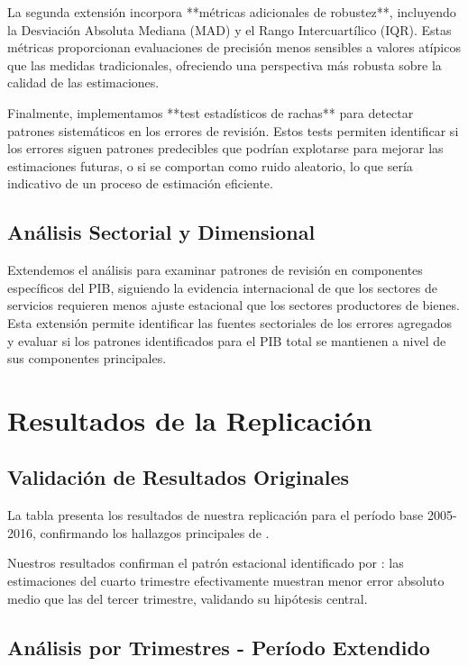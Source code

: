 \documentclass{article}
\begin{document}
La segunda extensión incorpora **métricas adicionales de robustez**, incluyendo la Desviación Absoluta Mediana (MAD) y el Rango Intercuartílico (IQR). Estas métricas proporcionan evaluaciones de precisión menos sensibles a valores atípicos que las medidas tradicionales, ofreciendo una perspectiva más robusta sobre la calidad de las estimaciones.

Finalmente, implementamos **test estadísticos de rachas** para detectar patrones sistemáticos en los errores de revisión. Estos tests permiten identificar si los errores siguen patrones predecibles que podrían explotarse para mejorar las estimaciones futuras, o si se comportan como ruido aleatorio, lo que sería indicativo de un proceso de estimación eficiente.

\subsection{Análisis Sectorial y Dimensional}

Extendemos el análisis para examinar patrones de revisión en componentes específicos del PIB, siguiendo la evidencia internacional de que los sectores de servicios requieren menos ajuste estacional que los sectores productores de bienes. Esta extensión permite identificar las fuentes sectoriales de los errores agregados y evaluar si los patrones identificados para el PIB total se mantienen a nivel de sus componentes principales.

\section{Resultados de la Replicación}

\subsection{Validación de Resultados Originales}

La tabla presenta los resultados de nuestra replicación para el período base 2005-2016, confirmando los hallazgos principales de \citet{pavia2017}.



Nuestros resultados confirman el patrón estacional identificado por \citet{pavia2017}: las estimaciones del cuarto trimestre efectivamente muestran menor error absoluto medio que las del tercer trimestre, validando su hipótesis central.

\subsection{Análisis por Trimestres - Período Extendido}
\end{document}
